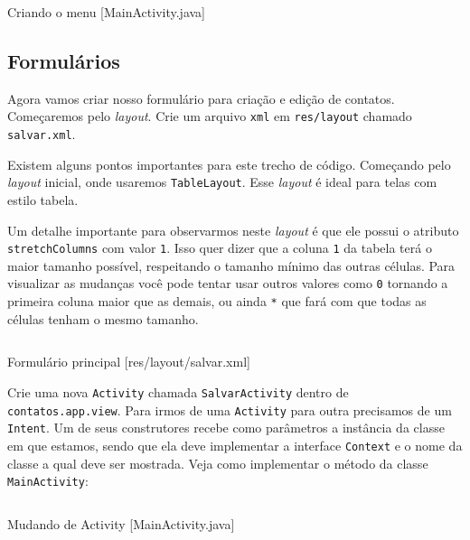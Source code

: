\begin{listing}[H]
  \inputminted[linenos=true,frame=bottomline,tabsize=3]{ java }{ source/MainActivity-2.java }
  \caption{Criando o menu [MainActivity.java]}
\end{listing}

\subsection{Formulários}

Agora vamos criar nosso formulário para criação e edição de contatos. Começaremos pelo \textit{layout}.
Crie um arquivo \texttt{xml} em \texttt{res/layout} chamado \texttt{salvar.xml}.

Existem alguns pontos importantes para este trecho de código. Começando pelo \textit{layout} inicial,
onde usaremos \texttt{TableLayout}. Esse \textit{layout} é ideal para telas com estilo tabela.

Um detalhe importante para observarmos neste \textit{layout} é que ele possui o atributo
\texttt{stretchColumns} com valor \texttt{1}. Isso quer dizer que a coluna \texttt{1} da tabela
terá o maior tamanho possível, respeitando o tamanho mínimo das outras células. Para visualizar as mudanças
você pode tentar usar outros valores como \texttt{0} tornando a primeira coluna maior que as demais,
ou ainda \texttt{*} que fará com que todas as células tenham o mesmo tamanho.

\begin{listing}[H]
  \inputminted[linenos=true,frame=bottomline,tabsize=3]{ xml }{ source/salvar-1.xml }
  \caption{Formulário principal [res/layout/salvar.xml]}
\end{listing}

Crie uma nova \texttt{Activity} chamada \texttt{SalvarActivity} dentro de \texttt{contatos.app.view}.
Para irmos de uma \texttt{Activity} para outra precisamos de um \texttt{Intent}. Um de seus construtores recebe
como parâmetros a instância da classe em que estamos, sendo que ela deve implementar a interface \texttt{Context}
e o nome da classe a qual deve ser mostrada. Veja como implementar o método 
da classe \texttt{MainActivity}:

\begin{listing}[H]
  \inputminted[linenos=true,frame=bottomline,tabsize=3]{ java }{ source/MainActivity-3.java }
  \caption{Mudando de Activity [MainActivity.java]}
\end{listing}

